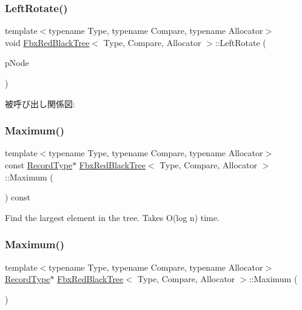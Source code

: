 \subsubsection{\texorpdfstring{Left\+Rotate()}{LeftRotate()}}
{\footnotesize\ttfamily template$<$typename Type, typename Compare, typename Allocator$>$ \\
void \hyperlink{class_fbx_red_black_tree}{Fbx\+Red\+Black\+Tree}$<$ Type, Compare, Allocator $>$\+::Left\+Rotate (\begin{DoxyParamCaption}\item[{\hyperlink{class_fbx_red_black_tree_1_1_record_type}{Record\+Type} $\ast$}]{p\+Node }\end{DoxyParamCaption})\hspace{0.3cm}{\ttfamily [protected]}}

被呼び出し関係図\+:
\mbox{\label{class_fbx_red_black_tree_ab4cbb7bbe5fab913a8296708a5b222ed}} 
\subsubsection{\texorpdfstring{Maximum()}{Maximum()}\hspace{0.1cm}{\footnotesize\ttfamily [1/2]}}
{\footnotesize\ttfamily template$<$typename Type, typename Compare, typename Allocator$>$ \\
const \hyperlink{class_fbx_red_black_tree_1_1_record_type}{Record\+Type}$\ast$ \hyperlink{class_fbx_red_black_tree}{Fbx\+Red\+Black\+Tree}$<$ Type, Compare, Allocator $>$\+::Maximum (\begin{DoxyParamCaption}{ }\end{DoxyParamCaption}) const}

Find the largest element in the tree. Takes O(log n) time. \mbox{\label{class_fbx_red_black_tree_a03b6f025d8466c40949f87a65c24e92e}} 
\subsubsection{\texorpdfstring{Maximum()}{Maximum()}\hspace{0.1cm}{\footnotesize\ttfamily [2/2]}}
{\footnotesize\ttfamily template$<$typename Type, typename Compare, typename Allocator$>$ \\
\hyperlink{class_fbx_red_black_tree_1_1_record_type}{Record\+Type}$\ast$ \hyperlink{class_fbx_red_black_tree}{Fbx\+Red\+Black\+Tree}$<$ Type, Compare, Allocator $>$\+::Maximum (\begin{DoxyParamCaption}{ }\end{DoxyParamCaption})}

